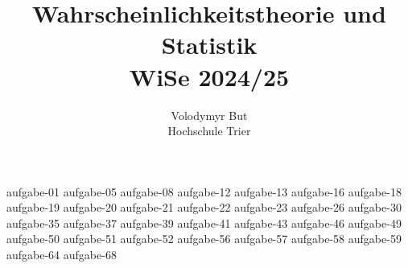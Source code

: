 \documentclass[10pt, oneside]{article}
\title{Wahrscheinlichkeitstheorie und Statistik\\[10pt]\Large{WiSe 2024/25}}
\author{Volodymyr But\\[10pt]Hochschule Trier}
\date{}
\begin{document}
\maketitle
\vspace{25px}

{aufgabe-01}
\pagebreak
{aufgabe-05}
\pagebreak
{aufgabe-08}
\pagebreak
{aufgabe-12}
\pagebreak
{aufgabe-13}
{aufgabe-16}
{aufgabe-18}
\pagebreak
{aufgabe-19}
{aufgabe-20}
\vspace{5px}
{aufgabe-21}
{aufgabe-22}
{aufgabe-23}
{aufgabe-26}
{aufgabe-30}
{aufgabe-35}
{aufgabe-37}
{aufgabe-39}
\vspace{5px}
{aufgabe-41}
{aufgabe-43}
\pagebreak
{aufgabe-46}
\pagebreak
{aufgabe-49}
{aufgabe-50}
{aufgabe-51}
\pagebreak
{aufgabe-52}
{aufgabe-56}
{aufgabe-57}
{aufgabe-58}
{aufgabe-59}
{aufgabe-64}
\pagebreak
{aufgabe-68}
\end{document}
